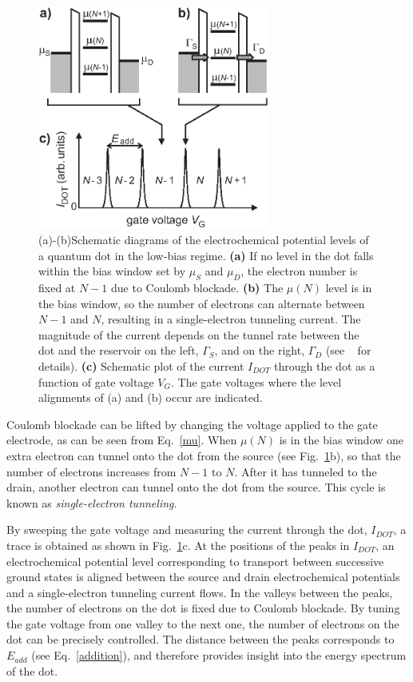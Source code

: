\documentclass[12pt,aps,nofootinbib]{revtex4-1}
\begin{document}
\begin{figure}[htbp]
\includegraphics[width=3in, clip=true]{hanson_fig03.eps}
\caption{(a)-(b)Schematic diagrams of the electrochemical
potential levels of a quantum dot in the low-bias regime.
\textbf{(a)} If no level in the dot falls within the bias window
set by $\mu_S$ and $\mu_D$, the electron number is fixed at
$N\!-\!1$ due to Coulomb blockade. \textbf{(b)} The $\mu(N)$ level
is in the bias window, so the number of electrons can alternate
between $N\!-\!1$ and $N$, resulting in a single-electron
tunneling current. The magnitude of the current depends on the
tunnel rate between the dot and the reservoir on the left,
$\Gamma_{S}$, and on the right, $\Gamma_{D}$ (see
~\textcite{Kouwenhoven97} for details). \textbf{(c)} Schematic
plot of the current $I_{DOT}$ through the dot as a function of
gate voltage $V_G$. The gate voltages where the level alignments
of (a) and (b) occur are indicated. } \label{fig:lowbias}
\end{figure}

Coulomb blockade can be lifted by changing the voltage applied to
the gate electrode, as can be seen from Eq.~\ref{mu}. When
$\mu(N)$ is in the bias window one extra electron can tunnel onto
the dot from the source (see Fig.~\ref{fig:lowbias}b), so that the
number of electrons increases from $N\!-\!1$ to $N$. After it has
tunneled to the drain, another electron can tunnel onto the dot
from the source. This cycle is known as \textit{single-electron
tunneling}.

By sweeping the gate voltage and measuring the current through the dot, $I_{DOT}$, a trace is
obtained as shown in Fig.~\ref{fig:lowbias}c. At the positions of
the peaks in $I_{DOT}$, an electrochemical potential level corresponding to
transport between successive ground states is aligned between the
source and drain electrochemical potentials and a single-electron
tunneling current flows. In the valleys between the peaks, the
number of electrons on the dot is fixed due to Coulomb blockade.
By tuning the gate voltage from one valley to the next one, the
number of electrons on the dot can be precisely controlled. The
distance between the peaks corresponds to $E_{add}$ (see
Eq.~\ref{addition}), and therefore provides insight into the
energy spectrum of the dot.
\end{document}
